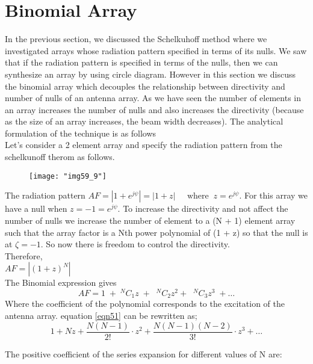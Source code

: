 	\chapter{Binomial Array}	
	In the previous section, we discussed the Schelkuhoff method where we investigated arrays whose radiation pattern specified in terms of its nulls. We saw that if the radiation pattern is specified in terms of the nulls, then we can synthesize an array by using circle diagram. However in this section we discuss the binomial array which decouples the relationship between directivity and number of nulls of an antenna array. As we have seen the number of elements in an array increases the number of nulls and also increases the directivity (because as the size of an array increases, the beam width decreases). The analytical formulation of the technique is as follows\\
	
	Let's consider a 2 element array and specify the radiation pattern from the schelkunoff therom as follows.\\
	\begin{figure}[H]
		\centering
		\texttt{[image: "img59\_9"]}
		\caption{}
		\label{fig:fig-11}
	\end{figure}
	The radiation pattern $AF = |1 + e^{j\psi}| = |1 + z| \; \; \; \; \; \text{where} \; \; z =  e^{j\psi}$. For this array we have a null when $z = -1 =  e^{j\psi}$. To increase the directivity and not affect the number of nulls we increase the number of element to a (N + 1) element array such that the array factor is a Nth power polynomial of (1 + z) so that the null is at $\zeta = -1$. So now there is freedom to control the directivity.\\
	Therefore,\\
	$AF = |(1 + z)^N|$\\
	The Binomial expression gives \\
	\begin{equation}
		AF = 1\;  +\;  {^NC_1z} \; +\; \; {^NC_2z^2} +\; \; {^NC_3z^3} \; + \ldots
		\label{eqn51}
	\end{equation}
	Where the coefficient of the polynomial corresponds to the excitation of the antenna array. equation \ref{eqn51} can be rewritten as;
	\begin{equation}
		1 + Nz + \dfrac{N(N - 1)}{2!}\cdot z^2 + \dfrac{N(N - 1)(N - 2)}{3!}\cdot z^3 + \ldots\label{eqn52}
	\end{equation}
	
	The positive coefficient of the series expansion for different values of N are:\\
	
